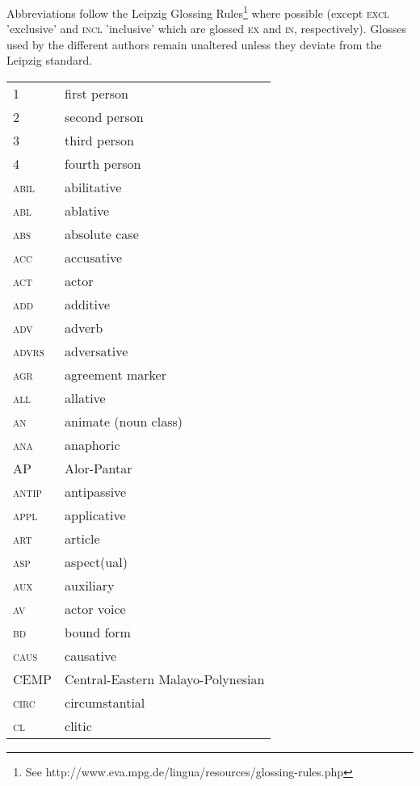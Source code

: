 
Abbreviations follow the Leipzig Glossing Rules\footnote{See http://www.eva.mpg.de/lingua/resources/glossing-rules.php} where possible (except \textsc{excl} 'exclusive' and \textsc{incl} 'inclusive' which are glossed \textsc{ex} and \textsc{in}, respectively). Glosses used by the different authors remain unaltered unless they deviate from the Leipzig standard.

\vspace{1cm}
\begin{longtable}{l l}
 \textsc{1}  & first person \\
 \textsc{2}  & second person \\
 \textsc{3}  & third person \\
 \textsc{4}  & fourth person \\
 \textsc{abil}  & abilitative \\
 \textsc{abl}  & ablative \\
 \textsc{abs}  & absolute case \\
 \textsc{acc}  & accusative \\
 \textsc{act}  & actor \\
 \textsc{add}  & additive \\
 \textsc{adv}  & adverb \\
 \textsc{advrs} & adversative \\
 \textsc{agr}  & agreement marker \\
 \textsc{all}  & allative \\
 \textsc{an}  & animate (noun class) \\
 \textsc{ana}  & anaphoric \\
 \textsc{AP}  & Alor-Pantar \\
 \textsc{antip}  & antipassive \\
 \textsc{appl}  & applicative \\
 \textsc{art}  & article \\
 \textsc{asp}  & aspect(ual) \\
 \textsc{aux}  & auxiliary \\
 \textsc{av}  & actor voice \\
 \textsc{bd}  & bound form \\
 \textsc{caus}  & causative \\
 \textsc{CEMP}  & Central-Eastern Malayo-Polynesian \\
 \textsc{circ}  & circumstantial \\
 \textsc{cl}  & clitic \\

\end{longtable}
